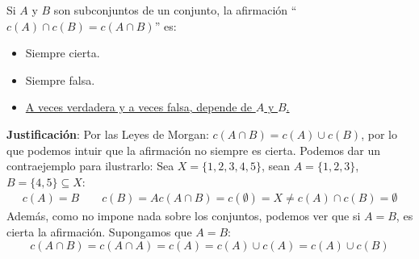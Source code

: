 \begin{ejercicio}
    Si $A$ y $B$ son subconjuntos de un conjunto, la afirmación \newline ``$c(A) \cap c(B) = c(A \cap B)$'' es:
    \begin{itemize}
        \item Siempre cierta.
        \item Siempre falsa.
        \item \underline{A veces verdadera y a veces falsa, depende de $A$ y $B$.}
    \end{itemize}

    \noindent
    \textbf{Justificación}:
    Por las Leyes de Morgan: $c(A \cap B) = c(A) \cup c(B)$, por lo que podemos intuir que la afirmación no siempre es cierta. Podemos dar un contraejemplo para ilustrarlo:\newline
    Sea $X = \{1,2,3,4,5\}$, sean $A = \{1,2,3\}$, $B = \{4,5\} \subseteq X$:
    \begin{gather*}
        c(A) = B\qquad c(B) = A
        c(A \cap B) = c(\emptyset) = X \neq c(A) \cap c(B) = \emptyset
    \end{gather*}
    Además, como no impone nada sobre los conjuntos, podemos ver que si $A = B$, es cierta la afirmación. Supongamos que $A = B$:
    \begin{equation}
        c(A \cap B) = c(A \cap A) = c(A) = c(A) \cup c(A) = c(A) \cup c(B)
    \end{equation}
\end{ejercicio}

